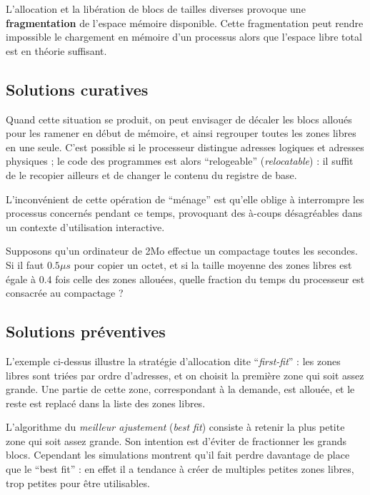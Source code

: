 \begin{multicols}{2}


L'allocation et la libération de blocs de tailles diverses provoque
une \textbf{fragmentation} de l'espace mémoire disponible.  Cette
fragmentation peut rendre impossible le chargement en mémoire d'un
processus alors que l'espace libre total est en théorie suffisant.

\subsection{Solutions curatives}

Quand cette situation se produit, on peut envisager de décaler les
blocs alloués pour les ramener en début de mémoire, et ainsi regrouper 
toutes les zones libres en une seule. C'est possible si le processeur
distingue adresses logiques et adresses physiques ; le code des
programmes est alors ``relogeable'' (\emph{relocatable}) : il suffit
de le recopier ailleurs et de changer le contenu du registre de base.

L'inconvénient de cette opération de ``ménage'' est qu'elle oblige à 
interrompre les processus concernés pendant ce temps, provoquant des 
à-coups
désagréables dans un contexte d'utilisation interactive.

\begin{exercice}
Supposons qu'un ordinateur de 2Mo effectue un compactage toutes les 
secondes.
Si il faut $0.5 \mu s$ pour copier un octet, et si la taille moyenne
 des zones libres est égale à 0.4 fois celle des zones allouées, quelle
  fraction du temps du processeur est consacrée au compactage ?
\end{exercice}

\subsection{Solutions préventives}

L'exemple ci-dessus illustre la stratégie d'allocation dite
``\emph{first-fit}'' : les zones libres sont triées par ordre
d'adresses, et on choisit la première zone qui soit assez grande.  Une
partie de cette zone, correspondant à la demande, est allouée, et le
reste est replacé dans la liste des zones libres.

L'algorithme du \emph{meilleur ajustement} (\emph{best fit}) consiste
à retenir la plus petite zone qui soit assez grande. Son intention  est
d'éviter de fractionner les grands blocs.  Cependant les simulations
montrent qu'il fait perdre davantage de place que le ``best fit'' : en
effet il a tendance à créer de multiples petites zones libres, trop
petites pour être utilisables.


\end{multicols}
